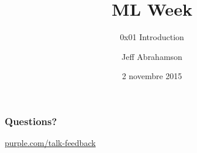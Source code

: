 \documentclass{beamer}
\author[Abrahamson] {Jeff Abrahamson}
\date{2 novembre 2015}
\title
{ML Week}
\subtitle{0x01 \hspace{2mm}  Introduction}
\begin{document}
\begin{frame}
  \titlepage
\end{frame}


\begin{frame}
\end{frame}

\begin{frame}
\end{frame}

\begin{frame}
\end{frame}

\begin{frame}
\end{frame}


\begin{frame}
  \frametitle{Questions?}
  \centerline{\large\url{purple.com/talk-feedback}}
\end{frame}
\end{document}
